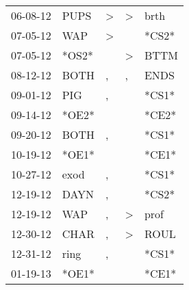 \begin{supertabular}{p{0.07\textwidth}p{0.06\textwidth}p{0.02\textwidth}p{0.02\textwidth}p{0.06\textwidth}}
          06-08-12\textsuperscript{} &           PUPS\textsuperscript{} &     \textgreater &     \textgreater &           brth\textsuperscript{} \\
          07-05-12\textsuperscript{} &            WAP\textsuperscript{} &     \textgreater &                  &                            *CS2* \\
          07-05-12\textsuperscript{} &                            *OS2* &                  &     \textgreater &           BTTM\textsuperscript{} \\
          08-12-12\textsuperscript{} &           BOTH\textsuperscript{} &                , &                , &           ENDS\textsuperscript{} \\
          09-01-12\textsuperscript{} &            PIG\textsuperscript{} &                , &                  &                            *CS1* \\
          09-14-12\textsuperscript{} &                            *OE2* &                  &                  &                            *CE2* \\
          09-20-12\textsuperscript{} &           BOTH\textsuperscript{} &                , &                  &                            *CS1* \\
          10-19-12\textsuperscript{} &                            *OE1* &                  &                  &                            *CE1* \\
          10-27-12\textsuperscript{} &           exod\textsuperscript{} &                , &                  &                            *CS1* \\
          12-19-12\textsuperscript{} &           DAYN\textsuperscript{} &                , &                  &                            *CS2* \\
          12-19-12\textsuperscript{} &            WAP\textsuperscript{} &                , &     \textgreater &           prof\textsuperscript{} \\
          12-30-12\textsuperscript{} &           CHAR\textsuperscript{} &                , &     \textgreater &           ROUL\textsuperscript{} \\
          12-31-12\textsuperscript{} &           ring\textsuperscript{} &                , &                  &                            *CS1* \\
          01-19-13\textsuperscript{} &                            *OE1* &                  &                  &                            *CE1* \\

\end{supertabular}
